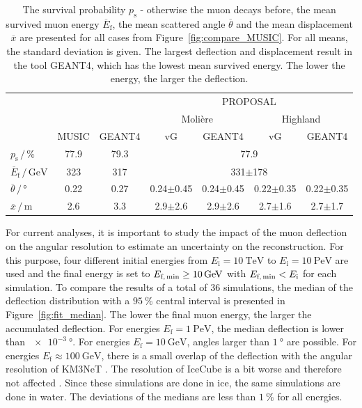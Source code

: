 \documentclass[pdflatex, sn-mathphys]{sn-jnl}%
\theoremstyle{thmstyleone}%
\theoremstyle{thmstyletwo}%
\theoremstyle{thmstylethree}%
\begin{document}
\begin{table}
    \small
    \centering
    \caption{The survival probability $p_{\text{s}}$ - otherwise the muon decays before, the mean survived muon 
    energy $\overline{E}_{\text{f}}$, the mean scattered angle $\overline{\theta}$ 
    and the mean displacement $\overline{x}$ are presented for all cases from 
    Figure~\ref{fig:compare_MUSIC}. For all means, the standard deviation is given.
    The largest deflection and displacement result in the tool GEANT4, which has the lowest mean survived energy. The lower the energy, the larger the deflection.}
    \begin{tabular}{l|cc|cccc}
        \toprule
        & & & \multicolumn{4}{c}{PROPOSAL} \\
        &  & & \multicolumn{2}{c}{Molière} & \multicolumn{2}{c}{Highland} \\
        & MUSIC & GEANT4 & vG & GEANT4 & vG & GEANT4 \\
        \midrule
        $p_{\text{s}}\,/\,\si{\percent}$ & 77.9 & 79.3 &  \multicolumn{4}{c}{77.9}\\
        $\overline{E}_{\text{f}}\,/\,\si{\giga\electronvolt}$ & 323 & 317 & \multicolumn{4}{c}{331$\pm$178} \\
        $\overline{\theta}\,/\,\si{\degree}$ & 0.22 & 0.27 & 0.24$\pm$0.45 & 0.24$\pm$0.45 & 0.22$\pm$0.35 & 0.22$\pm$0.35   \\
        $\overline{x}\,/\,\si{\meter}$ & 2.6 & 3.3 & 2.9$\pm$2.6 & 2.9$\pm$2.6 & 2.7$\pm$1.6 & 2.7$\pm$1.7  \\
     \bottomrule
    \end{tabular}
    \label{tab:compare_MUSIC}
\end{table}

For current analyses, it is important to study the impact of the muon 
deflection on the angular resolution to estimate an uncertainty on the reconstruction.
For this purpose, four different initial energies 
from $E_{\text{i}} = \SI{10}{\tera\electronvolt}$ to 
$E_{\text{i}} = \SI{10}{\peta\electronvolt}$ are used and the final 
energy is set to $E_{\text{f,\,min}} \geq \SI{10}{\giga\electronvolt}$ with 
$E_{\text{f,\,min}} < E_{\text{i}}$ for each simulation. To compare the results of 
a total of $\num{36}$ simulations, the median of the deflection distribution 
with a $\SI{95}{\percent}$ central interval is presented in 
Figure~\ref{fig:fit_median}.
The lower the final muon energy, the larger the accumulated deflection. 
For energies $E_{\text{f}} = \SI{1}{\peta\electronvolt}$, the median deflection 
is lower than $\SI{e-3}{\degree}$. For energies $E_{\text{f}} = \SI{10}{\giga\electronvolt}$, 
angles larger than $\SI{1}{\degree}$ are possible. For energies  
$E_{\text{f}} \approx \SI{100}{\giga\electronvolt}$, 
there is a small overlap of the deflection with the angular resolution of KM3NeT 
\cite{KM3NeT_Resolution2016}. The resolution of IceCube is a bit worse and 
therefore not affected \cite{IceCube_Resolution2021}. Since these simulations are done 
in ice, the same simulations are done in water. The deviations of the medians
are less than $\SI{1}{\percent}$ for all energies.
\end{document}
